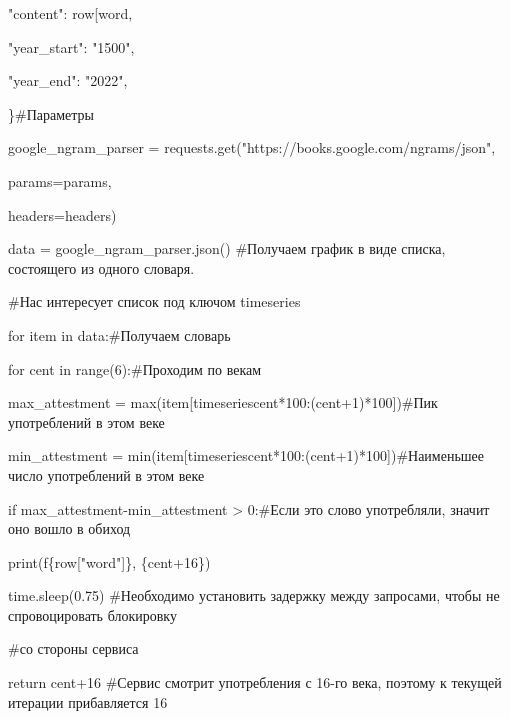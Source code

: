 "content": row{[}\textquotesingle word\textquotesingle{]},

"year\_start": "1500",

"year\_end": "2022",

\}\#Параметры

google\_ngram\_parser = requests.get("https://books.google.com/ngrams/json",

params=params,

headers=headers)

data = google\_ngram\_parser.json() \#Получаем график в виде списка, состоящего из одного словаря.

\#Нас интересует список под ключом \textquotesingle timeseries\textquotesingle{}

for item in data:\#Получаем словарь

for cent in range(6):\#Проходим по векам

max\_attestment = max(item{[}\textquotesingle timeseries\textquotesingle{]}{[}cent*100:(cent+1)*100{]})\#Пик употреблений в этом веке

min\_attestment = min(item{[}\textquotesingle timeseries\textquotesingle{]}{[}cent*100:(cent+1)*100{]})\#Наименьшее число употреблений в этом веке

if max\_attestment-min\_attestment \textgreater{} 0:\#Если это слово употребляли, значит оно вошло в обиход

print(f\textquotesingle\{row{[}"word"{]}\}, \{cent+16\}\textquotesingle)

time.sleep(0.75) \#Необходимо установить задержку между запросами, чтобы не спровоцировать блокировку

\#со стороны сервиса

return cent+16 \#Сервис смотрит употребления с 16-го века, поэтому к текущей итерации прибавляется 16
